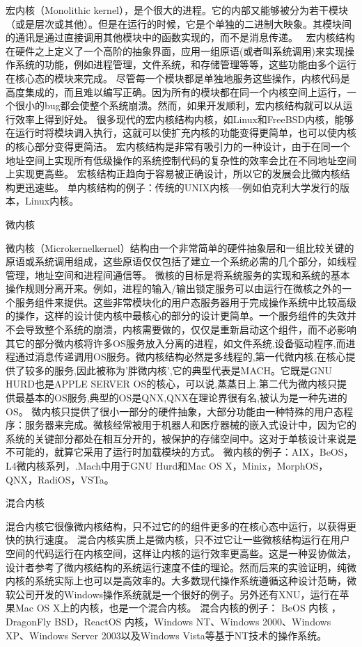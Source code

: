 \documentclass[utf8]{book}
\begin{document}
宏内核（Monolithic kernel），是个很大的进程。它的内部又能够被分为若干模块（或是层次或其他）。但是在运行的时候，它是个单独的二进制大映象。其模块间的通讯是通过直接调用其他模块中的函数实现的，而不是消息传递。　
宏内核结构在硬件之上定义了一个高阶的抽象界面，应用一组原语(或者叫系统调用)来实现操作系统的功能，例如进程管理，文件系统，和存储管理等等，这些功能由多个运行在核心态的模块来完成。
尽管每一个模块都是单独地服务这些操作，内核代码是高度集成的，而且难以编写正确。因为所有的模块都在同一个内核空间上运行，一个很小的bug都会使整个系统崩溃。然而，如果开发顺利，宏内核结构就可以从运行效率上得到好处。
很多现代的宏内核结构内核，如Linux和FreeBSD内核，能够在运行时将模块调入执行，这就可以使扩充内核的功能变得更简单，也可以使内核的核心部分变得更简洁。
宏内核结构是非常有吸引力的一种设计，由于在同一个地址空间上实现所有低级操作的系统控制代码的复杂性的效率会比在不同地址空间上实现更高些。 宏核结构正趋向于容易被正确设计，所以它的发展会比微内核结构更迅速些。
单内核结构的例子：传统的UNIX内核----例如伯克利大学发行的版本，Linux内核。

{\large 微内核}

微内核（Microkernelkernel）结构由一个非常简单的硬件抽象层和一组比较关键的原语或系统调用组成，这些原语仅仅包括了建立一个系统必需的几个部分，如线程管理，地址空间和进程间通信等。
微核的目标是将系统服务的实现和系统的基本操作规则分离开来。例如，进程的输入/输出锁定服务可以由运行在微核之外的一个服务组件来提供。这些非常模块化的用户态服务器用于完成操作系统中比较高级的操作，这样的设计使内核中最核心的部分的设计更简单。一个服务组件的失效并不会导致整个系统的崩溃，内核需要做的，仅仅是重新启动这个组件，而不必影响其它的部分微内核将许多OS服务放入分离的进程，如文件系统,设备驱动程序,而进程通过消息传递调用OS服务。微内核结构必然是多线程的,第一代微内核,在核心提供了较多的服务,因此被称为'胖微内核',它的典型代表是MACH。它既是GNU HURD也是APPLE SERVER OS的核心，可以说,蒸蒸日上.第二代为微内核只提供最基本的OS服务,典型的OS是QNX,QNX在理论界很有名,被认为是一种先进的OS。
微内核只提供了很小一部分的硬件抽象，大部分功能由一种特殊的用户态程序：服务器来完成。微核经常被用于机器人和医疗器械的嵌入式设计中，因为它的系统的关键部分都处在相互分开的，被保护的存储空间中。这对于单核设计来说是不可能的，就算它采用了运行时加载模块的方式。
微内核的例子：AIX，BeOS，L4微内核系列，.Mach中用于GNU Hurd和Mac OS X，Minix，MorphOS，QNX，RadiOS，VSTa。

{\large 混合内核}

混合内核它很像微内核结构，只不过它的的组件更多的在核心态中运行，以获得更快的执行速度。
混合内核实质上是微内核，只不过它让一些微核结构运行在用户空间的代码运行在内核空间，这样让内核的运行效率更高些。这是一种妥协做法，设计者参考了微内核结构的系统运行速度不佳的理论。然而后来的实验证明，纯微内核的系统实际上也可以是高效率的。大多数现代操作系统遵循这种设计范畴，微软公司开发的Windows操作系统就是一个很好的例子。另外还有XNU，运行在苹果Mac OS X上的内核，也是一个混合内核。
混合内核的例子： BeOS 内核 ，DragonFly BSD，ReactOS 内核，Windows NT、Windows 2000、Windows XP、Windows Server 2003以及Windows Vista等基于NT技术的操作系统。
\end{document}
